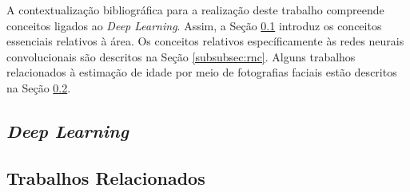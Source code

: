 
A contextualização bibliográfica para a realização deste trabalho compreende conceitos ligados ao \emph{
Deep Learning}. Assim, a Seção \ref{sec:dl} introduz os conceitos essenciais relativos à área. Os conceitos relativos específicamente às redes neurais convolucionais são descritos na Seção \ref{subsubsec:rnc}. Alguns trabalhos relacionados à estimação de idade por meio de fotografias faciais estão descritos na Seção \ref{sec:trab_relac}.

% 
%
% 

\subsection{\emph{Deep Learning}}\label{sec:dl}


\subsection{Trabalhos Relacionados}\label{sec:trab_relac}

